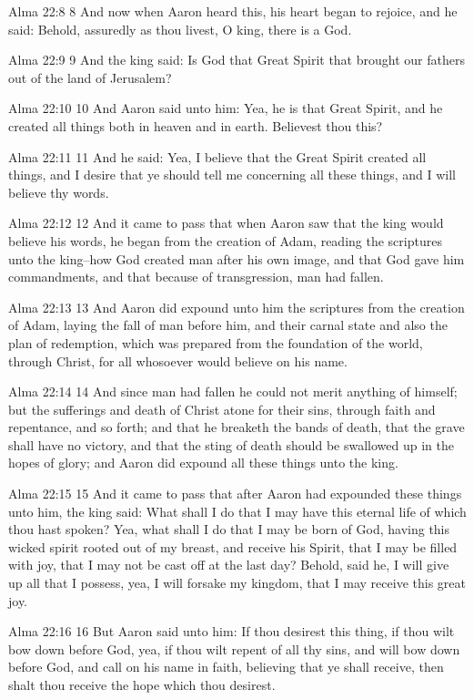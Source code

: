 Alma 22:8
 8 And now when Aaron heard this, his heart began to rejoice, and
he said: Behold, assuredly as thou livest, O king, there is a
God.

Alma 22:9
 9 And the king said: Is God that Great Spirit that brought our
fathers out of the land of Jerusalem?

Alma 22:10
 10 And Aaron said unto him: Yea, he is that Great Spirit, and he
created all things both in heaven and in earth. Believest thou
this?

Alma 22:11
 11 And he said: Yea, I believe that the Great Spirit created all
things, and I desire that ye should tell me concerning all these
things, and I will believe thy words.

Alma 22:12
 12 And it came to pass that when Aaron saw that the king would
believe his words, he began from the creation of Adam, reading
the scriptures unto the king--how God created man after his own
image, and that God gave him commandments, and that because of
transgression, man had fallen.

Alma 22:13
 13 And Aaron did expound unto him the scriptures from the
creation of Adam, laying the fall of man before him, and their
carnal state and also the plan of redemption, which was prepared
from the foundation of the world, through Christ, for all
whosoever would believe on his name.

Alma 22:14
 14 And since man had fallen he could not merit anything of
himself; but the sufferings and death of Christ atone for their
sins, through faith and repentance, and so forth; and that he
breaketh the bands of death, that the grave shall have no
victory, and that the sting of death should be swallowed up in
the hopes of glory; and Aaron did expound all these things unto
the king.

Alma 22:15
 15 And it came to pass that after Aaron had expounded these
things unto him, the king said: What shall I do that I may have
this eternal life of which thou hast spoken? Yea, what shall I
do that I may be born of God, having this wicked spirit rooted
out of my breast, and receive his Spirit, that I may be filled
with joy, that I may not be cast off at the last day? Behold,
said he, I will give up all that I possess, yea, I will forsake
my kingdom, that I may receive this great joy.

Alma 22:16
 16 But Aaron said unto him: If thou desirest this thing, if thou
wilt bow down before God, yea, if thou wilt repent of all thy
sins, and will bow down before God, and call on his name in
faith, believing that ye shall receive, then shalt thou receive
the hope which thou desirest.

